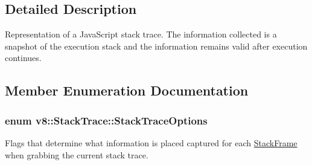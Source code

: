 \subsection{Detailed Description}
Representation of a Java\-Script stack trace. The information collected is a snapshot of the execution stack and the information remains valid after execution continues. 

\subsection{Member Enumeration Documentation}
\hypertarget{classv8_1_1StackTrace_a9704e4a37949eb8eb8ccddbddf161492}{
\subsubsection[{Stack\-Trace\-Options}]{\setlength{\rightskip}{0pt plus 5cm}enum {\bf v8\-::\-Stack\-Trace\-::\-Stack\-Trace\-Options}}}\label{classv8_1_1StackTrace_a9704e4a37949eb8eb8ccddbddf161492}
Flags that determine what information is placed captured for each \hyperlink{classv8_1_1StackFrame}{Stack\-Frame} when grabbing the current stack trace. 

